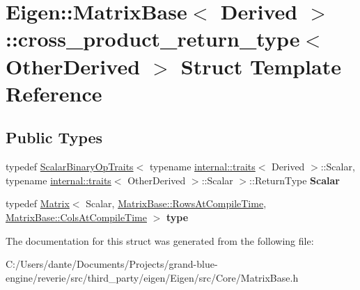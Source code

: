 \hypertarget{struct_eigen_1_1_matrix_base_1_1cross__product__return__type}{}\section{Eigen\+::Matrix\+Base$<$ Derived $>$\+::cross\+\_\+product\+\_\+return\+\_\+type$<$ Other\+Derived $>$ Struct Template Reference}
\label{struct_eigen_1_1_matrix_base_1_1cross__product__return__type}
\subsection*{Public Types}
\begin{DoxyCompactItemize}
\item 
\mbox{\label{struct_eigen_1_1_matrix_base_1_1cross__product__return__type_a6e0581468e4f9491c64d92d748b6f3f9}} 
typedef \mbox{\hyperlink{struct_eigen_1_1_scalar_binary_op_traits}{Scalar\+Binary\+Op\+Traits}}$<$ typename \mbox{\hyperlink{struct_eigen_1_1internal_1_1traits}{internal\+::traits}}$<$ Derived $>$\+::Scalar, typename \mbox{\hyperlink{struct_eigen_1_1internal_1_1traits}{internal\+::traits}}$<$ Other\+Derived $>$\+::Scalar $>$\+::Return\+Type {\bfseries Scalar}
\item 
\mbox{\label{struct_eigen_1_1_matrix_base_1_1cross__product__return__type_ad0d0f7a06c69ccea87a0ec5c397d8ec5}} 
typedef \mbox{\hyperlink{class_eigen_1_1_matrix}{Matrix}}$<$ Scalar, \mbox{\hyperlink{class_eigen_1_1_dense_base_a86241c772c74c04eeeb0480b99c5ab77adb37c78ebbf15aa20b65c3b70415a1ab}{Matrix\+Base\+::\+Rows\+At\+Compile\+Time}}, \mbox{\hyperlink{class_eigen_1_1_dense_base_a86241c772c74c04eeeb0480b99c5ab77a787f85fd67ee5985917eb2cef6e70441}{Matrix\+Base\+::\+Cols\+At\+Compile\+Time}} $>$ {\bfseries type}
\end{DoxyCompactItemize}


The documentation for this struct was generated from the following file\+:\begin{DoxyCompactItemize}
\item 
C\+:/\+Users/dante/\+Documents/\+Projects/grand-\/blue-\/engine/reverie/src/third\+\_\+party/eigen/\+Eigen/src/\+Core/Matrix\+Base.\+h\end{DoxyCompactItemize}
